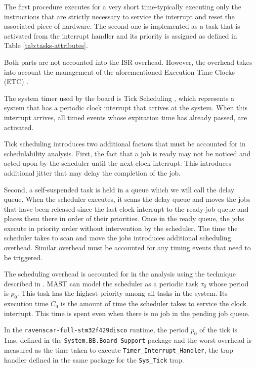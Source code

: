 \documentclass{article}
\begin{document}
The first procedure executes for a very short time-typically executing only the instructions that are strictly necessary to service the interrupt and reset the associated piece of hardware. The second one is implemented as a task that is activated from the interrupt handler and its priority is assigned as defined in Table \ref{tab:tasks-attributes}.

Both parts are not accounted into the ISR overhead. However, the overhead takes into account the management of the aforementioned Execution Time Clocks (ETC) \cite{etc}.

The system timer used by the board is Tick Scheduling \cite{tick-scheduling}, which represents a system that has a periodic clock interrupt that arrives at the system. When this interrupt arrives, all timed events whose expiration time has already passed, are activated.

Tick scheduling introduces two additional factors that must be accounted for in schedulability analysis. First, the fact that a job is ready may not be noticed and acted upon by the scheduler until the next clock interrupt. This introduces additional jitter that may delay the completion of the job.

Second, a self-suspended task is held in a queue which we will call the delay queue. When the scheduler executes, it scans the delay queue and moves the jobs that have been released since the last clock interrupt to the ready job queue and places them there in order of their priorities. Once in the ready queue, the jobs execute in priority order without intervention by the scheduler. The time the scheduler takes to scan and move the jobs introduces additional scheduling overhead. Similar overhead must be accounted for any timing events that need to be triggered.

The scheduling overhead is accounted for in the analysis using the technique described in \cite{effects-runtime}. MAST can model the scheduler as a periodic task $\tau_0$ whose period is $p_0$. This task has the highest priority among all tasks in the system. Its execution time $C_0$ is the amount of time the scheduler takes to service the clock interrupt. This time is spent even when there is no job in the pending job queue.

In the \texttt{ravenscar-full-stm32f429disco} runtime, the period $p_0$ of the tick is 1ms, defined in the \texttt{System.BB.Board\_Support} package and the worst overhead is measured as the time taken to execute \texttt{Timer\_Interrupt\_Handler}, the trap handler defined in the same package for the \texttt{Sys\_Tick} trap.
\end{document}
